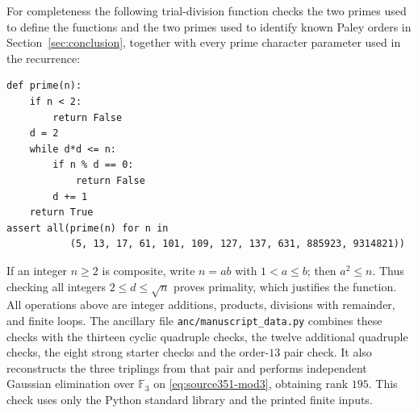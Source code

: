 \documentclass[10pt]{article}
\newcommand{\F}{\mathbb F}
\begin{document}
For completeness the following trial-division function checks the two
primes used to define the functions and the two primes used to identify
known Paley orders in Section~\ref{sec:conclusion}, together with every
prime character parameter used in the recurrence:
\begin{verbatim}
def prime(n):
    if n < 2:
        return False
    d = 2
    while d*d <= n:
        if n % d == 0:
            return False
        d += 1
    return True
assert all(prime(n) for n in
           (5, 13, 17, 61, 101, 109, 127, 137, 631, 885923, 9314821))
\end{verbatim}
If an integer $n\geq2$ is composite, write $n=ab$ with $1<a\leq b$;
then $a^2\leq n$. Thus checking all integers $2\leq d\leq\sqrt n$
proves primality, which justifies the function. All operations above are
integer additions, products, divisions with remainder, and finite loops.
The ancillary file \texttt{anc/manuscript\_data.py} combines these checks
with the thirteen cyclic quadruple checks, the twelve additional quadruple
checks, the eight strong starter checks and the order-$13$ pair check.
It also reconstructs the three triplings from that pair and performs
independent Gaussian elimination over $\F_3$ on
\eqref{eq:source351-mod3}, obtaining rank $195$. This check uses only
the Python standard library and the printed finite inputs.
\end{document}
